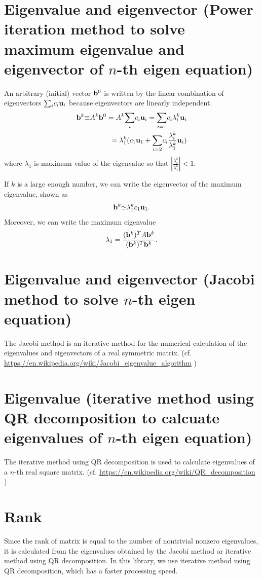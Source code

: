 \documentclass[dvipdfmx]{article}
\begin{document}
 
\section*{Eigenvalue and eigenvector (Power iteration method to solve maximum eigenvalue and eigenvector of $n$-th eigen equation)}
An arbitrary (initial) vector ${\bf{b}}^0$ is written by the linear combination of eigenvectors ${\sum_i} c_i{\bf{u}}_i$
because eigenvectors are linearly independent.
\begin{eqnarray}
{\bf{b}}^k {\equiv} A^k {\bf{b}}^0 = A^k {\sum_i} c_i{\bf{u}}_i = {\sum_{i=1}} c_i {\lambda}^k_i {\bf{u}}_i \nonumber \\
= {\lambda}_1^k (c_1{\bf{u}}_1 + {\sum_{i=2}} c_i \frac{{\lambda}^k_i}{{\lambda}^k_1} {\bf{u}}_i)  \nonumber
\end{eqnarray}
where ${\lambda}_1$ is maximum value of the eigenvalue so that $|\frac{{\lambda}^k_i}{{\lambda}^k_1}| < 1$.
 
If $k$ is a large enough number, 
we can write the eigenvector of the maximum eigenvalue, shown as
\begin{eqnarray}
{\bf{b}}^k {\simeq} {\lambda}^k_1c_1{\bf{u}}_1. \nonumber
\end{eqnarray} 
Moreover,  we can write the maximum eigenvalue
\begin{eqnarray}
{\lambda}_1 = \frac{({\bf{b}}^k)^TA{\bf{b}}^k}{({\bf{b}}^k)^T{\bf{b}}^k}. \nonumber
\end{eqnarray}


\section*{Eigenvalue and eigenvector (Jacobi method to solve $n$-th eigen equation)}
The Jacobi method is an iterative method for the numerical calculation of the eigenvalues and eigenvectors of a real symmetric matrix.
(cf. \url{https://en.wikipedia.org/wiki/Jacobi_eigenvalue_algorithm} )


\section*{Eigenvalue (iterative method using QR decomposition to calcuate eigenvalues of $n$-th eigen equation)}
The iterative method using QR decomposition is used to calculate eigenvalues of a $n$-th real square matrix.
(cf. \url{https://en.wikipedia.org/wiki/QR_decomposition} )


\section*{Rank}
Since the rank of matrix is equal to the number of nontrivial nonzero eigenvalues, 
it is calculated from the eigenvalues obtained by the Jacobi method or iterative method using QR decomposition.
In this library, we use iterative method using QR decomposition, which has a faster processing speed.
\end{document}
